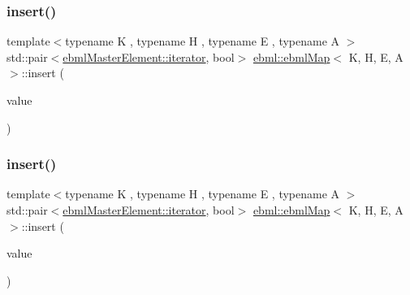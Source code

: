 \subsubsection{\texorpdfstring{insert()}{insert()}\hspace{0.1cm}{\footnotesize\ttfamily [1/6]}}
{\footnotesize\ttfamily template$<$typename K , typename H , typename E , typename A $>$ \\
std\+::pair$<$\mbox{\hyperlink{classebml_1_1ebmlMasterElement_1_1iterator}{ebml\+Master\+Element\+::iterator}}, bool$>$ \mbox{\hyperlink{classebml_1_1ebmlMap}{ebml\+::ebml\+Map}}$<$ K, H, E, A $>$\+::insert (\begin{DoxyParamCaption}\item[{const \mbox{\hyperlink{namespaceebml_adad533b7705a16bb360fe56380c5e7be}{ebml\+Element\+\_\+sp}} \&}]{value }\end{DoxyParamCaption})}

\mbox{\label{classebml_1_1ebmlMap_a6a0236ad1baa318bbd65ce2b755eb3f9}} 
\subsubsection{\texorpdfstring{insert()}{insert()}\hspace{0.1cm}{\footnotesize\ttfamily [2/6]}}
{\footnotesize\ttfamily template$<$typename K , typename H , typename E , typename A $>$ \\
std\+::pair$<$\mbox{\hyperlink{classebml_1_1ebmlMasterElement_1_1iterator}{ebml\+Master\+Element\+::iterator}}, bool$>$ \mbox{\hyperlink{classebml_1_1ebmlMap}{ebml\+::ebml\+Map}}$<$ K, H, E, A $>$\+::insert (\begin{DoxyParamCaption}\item[{\mbox{\hyperlink{namespaceebml_adad533b7705a16bb360fe56380c5e7be}{ebml\+Element\+\_\+sp}} \&\&}]{value }\end{DoxyParamCaption})}

\mbox{\label{classebml_1_1ebmlMap_a2e03c68cc11f716e908fd46ab3db8cdc}} 
